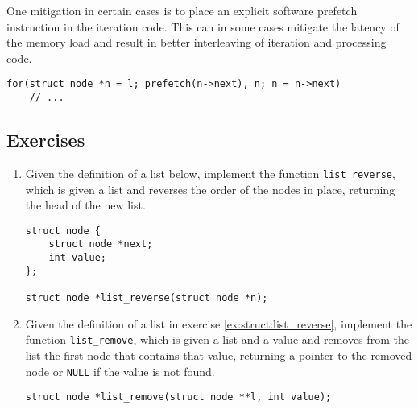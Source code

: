One mitigation in certain cases is to place an explicit software prefetch
instruction in the iteration code.  This can in some cases mitigate the latency
of the memory load and result in better interleaving of iteration and processing
code\footnotemark.


\begin{lstlisting}
for(struct node *n = l; prefetch(n->next), n; n = n->next)
    // ...
\end{lstlisting}

\subsection{Exercises}

\begin{enumerate}
    \item
        \label{ex:struct:list_reverse}
        Given the definition of a list below, implement the function
        \texttt{list\_reverse}, which is given a list and reverses the order of
        the nodes in place, returning the head of the new list.
        \begin{lstlisting}[style=c]
struct node {
    struct node *next;
    int value;
};

struct node *list_reverse(struct node *n);
        \end{lstlisting}
    \item
        \label{ex:struct:list_remove}
        Given the definition of a list in exercise \ref{ex:struct:list_reverse},
        implement the function \texttt{list\_remove}, which is given a list and
        a value and removes from the list the first node that contains that
        value, returning a pointer to the removed node or \texttt{NULL} if the
        value is not found.
        \begin{lstlisting}[style=c]
struct node *list_remove(struct node **l, int value);
        \end{lstlisting}
\end{enumerate}
